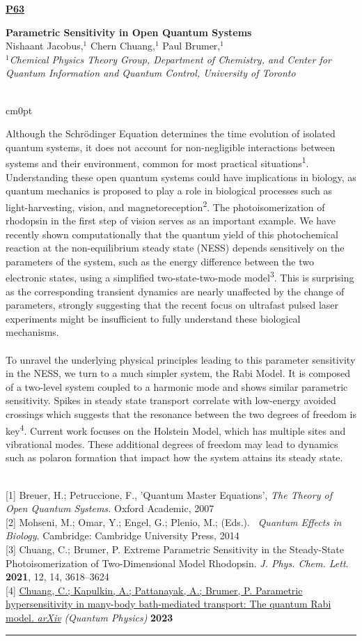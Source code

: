 \documentclass[titlepage,oneside,openany,10pt]{book}
\newenvironment{posterabswrefwfig}[8] %
        {
        \newcommand{\posterref}{#5}
	\FPeval{\cutw}{clip(16.7-#7)}
	\FPeval{\cutl}{round(#8/0.35+1,3)}
	\begin{flushright}
                \underline{\textbf{#4}}
        \end{flushright}
        \textbf{#1}\\%
        #2\\%
        \textit{#3}\\\\%
        \def\windowpagestuff{\centering
                \texttt{[image: \#6]}
	}
        \opencutright
        \begin{cutout}{0}{\cutw cm}{0pt}{\RoundingUpFunction{\cutl}}
        \noindent
	}
	{
	\end{cutout}
	\vspace{0.5cm}
	\\\noindent \posterref \\ \noindent\rule{15cm}{0.5pt}%
        }
\begin{document}
\begin{posterabswrefwfig}
	{Parametric Sensitivity in Open Quantum Systems}
	{Nishaant Jacobus,$^{1}$ Chern Chuang,$^{1}$ Paul Brumer,$^{1}$}
	{
	$^1$Chemical Physics Theory Group, Department of Chemistry, and Center for Quantum Information and Quantum Control, University of Toronto
	}
	{P63}
	{
	{[1]} Breuer, H.; Petruccione, F., 'Quantum Master Equations', \emph{The Theory of Open Quantum Systems.} Oxford Academic, 2007\\
	{[2]} Mohseni, M.; Omar, Y.; Engel, G.; Plenio, M.; (Eds.).~ \emph{Quantum Effects in Biology}. Cambridge: Cambridge University Press, 2014\\
	{[3]} Chuang, C.; Brumer, P. Extreme Parametric Sensitivity in the Steady-State Photoisomerization of Two-Dimensional Model Rhodopsin. \emph{J. Phys. Chem. Lett}.~ \textbf{2021}, 12, 14, 3618--3624\\
	{[4]} \href{https://arxiv.org/abs/2211.11285}{Chuang, C.; Kapulkin, A.; Pattanayak, A.; Brumer, P. Parametric hypersensitivity in many-body bath-mediated transport: The quantum Rabi model. \emph{arXiv}}  \emph{(Quantum Physics)}  \textbf{2023}
	}
	{abstract_figures/Jacobus_Nishaant_Poster.png}
	{10.0}
	{4.0}
	Although the Schr\"{o}dinger Equation determines the time evolution of isolated quantum systems, it does not account for non-negligible interactions between systems and their environment, common for most practical situations\textsuperscript{1}. Understanding these open quantum systems could have implications in biology, as quantum mechanics is proposed to play a role in biological processes such as light-harvesting, vision, and magnetoreception\textsuperscript{2}. The photoisomerization of rhodopsin in the first step of vision serves as an important example. We have recently shown computationally that the quantum yield of this photochemical reaction at the non-equilibrium steady state (NESS) depends sensitively on the parameters of the system, such as the energy difference between the two electronic states, using a simplified two-state-two-mode model\textsuperscript{3}. This is surprising as the corresponding transient dynamics are nearly unaffected by the change of parameters, strongly suggesting that the recent focus on ultrafast pulsed laser experiments might be insufficient to fully understand these biological mechanisms.\\ ~ \\To unravel the underlying physical principles leading to this parameter sensitivity in the NESS, we turn to a much simpler system, the Rabi Model. It is composed of a two-level system coupled to a harmonic mode and shows similar parametric sensitivity. Spikes in steady state transport correlate with low-energy avoided crossings which suggests that the resonance between the two degrees of freedom is key\textsuperscript{4}. Current work focuses on the Holstein Model, which has multiple sites and vibrational modes. These additional degrees of freedom may lead to dynamics such as polaron formation that impact how the system attains its steady state.
	\label{JacobusN}
\end{posterabswrefwfig}
\end{document}
